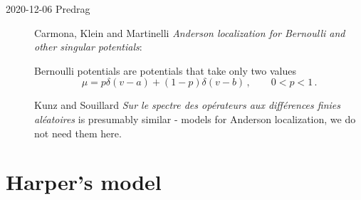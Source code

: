 \begin{description}
\item[2020-12-06 Predrag]
Carmona, Klein and Martinelli {\em Anderson localization for
Bernoulli and other singular potentials}:

Bernoulli potentials are potentials that take only two values
\[
\mu  = p\delta(v-a)+ (1-p)\delta(v-b)
\,,\qquad
0<p<1
\,.
\]

Kunz and Souillard {\em Sur le spectre des op{\'e}rateurs
aux diff{\'e}rences finies al{\'e}atoires} is presumably similar -
models for Anderson localization, we do not need them here.


\end{description}

\section{Harper's model}
\label{sect:Harper}


